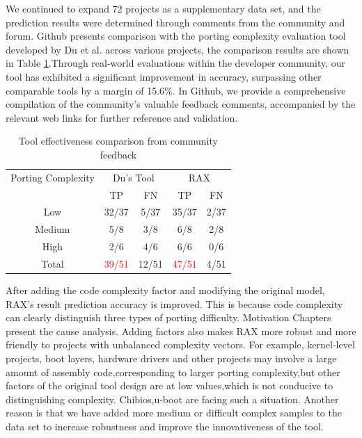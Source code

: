 \documentclass[sigconf,screen,review,anonymous]{acmart}
\begin{document}
We continued to expand 72 projects as a supplementary data set, and the prediction results were determined through comments from the community and forum.
Github presents comparison\cite{githubss} with the porting complexity evaluation tool developed by Du et al. across various projects, the comparison results are shown in Table \ref{tab:effectiveness}.Through real-world evaluations within the developer community, our tool has exhibited a significant improvement in accuracy, surpassing other comparable tools by a margin of 15.6\%. In Github, we provide a comprehensive compilation of the community's valuable feedback comments, accompanied by the relevant web links for further reference and validation.

\begin{table}
  \caption{Tool effectiveness comparison from community feedback}
  \label{tab:effectiveness}
  \begin{tabular}{ccccc}
    \toprule
    Porting Complexity & \multicolumn{2}{c}{Du's Tool} & \multicolumn{2}{c}{RAX} \\
     & TP & FN & TP & FN \\
    \midrule
    Low &32/37 & 5/37 & 35/37 & 2/37 \\
    Medium & 5/8 & 3/8 & 6/8 & 2/8 \\
    High & 2/6 & 4/6 & 6/6 & 0/6 \\
    \midrule
    Total & \textcolor{red}{39/51} & 12/51& \textcolor{red}{47/51} & 4/51 \\
      \bottomrule
\end{tabular}
\end{table}

After adding the code complexity factor and modifying the original model, RAX's result prediction accuracy is improved.
This is because code complexity can clearly distinguish three types of porting difficulty.
Motivation Chapters present the cause analysis.
Adding factors also makes RAX more robust and more friendly to projects with unbalanced complexity vectors.
For example, kernel-level projects, boot layers, hardware drivers and other projects may involve a large amount of assembly code,corresponding to larger porting complexity,but other factors of the original tool design are at low values,which is not conducive to distinguishing complexity.
Chibios,u-boot are facing such a situation. Another reason is that we have added more medium or difficult complex samples to the data set to increase robustness and improve the innovativeness of the tool.     
\end{document}
